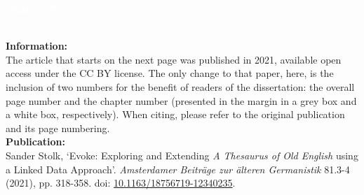 \noindent{\color{white}\rule{\textwidth}{0.01em}}
\checkoddpage\ifoddpage\newpage\mbox{}\else\fi

\thispagestyle{empty}


\begin{center}
\setlength\fboxsep{1cm}
\noindent\colorbox{evokelightblue}{
\parbox[c][1.0in-2cm]{\textwidth-2cm}{\RaggedLeft\Huge \textbf{\textcolor{white}{Chapter 7}}}}
\end{center}

\noindent{\color{lightgray}\rule{\textwidth}{0.4em}}
\\[2em]
\noindent\textbf{Information:}\\
The article that starts on the next page was published in 2021, available open access under the CC BY license. The only change to that paper, here, is the inclusion of two numbers for the benefit of readers of the dissertation: the overall page number and the chapter number (presented in the margin in a grey box and a white box, respectively). When citing, please refer to the original publication and its page numbering.
\\[1em]
\noindent\textbf{Publication:}\\
    Sander Stolk, `Evoke: Exploring and Extending \emph{A Thesaurus of Old English} using a Linked Data Approach'. \textit{Amsterdamer Beiträge zur älteren Germanistik} 81.3-4 (2021), pp. 318-358. doi: \href{https://doi.org/10.1163/18756719-12340235}{\url{10.1163/18756719-12340235}}.
\noindent
\\[1em]
\noindent{\color{lightgray}\rule{\textwidth}{0.4em}}
